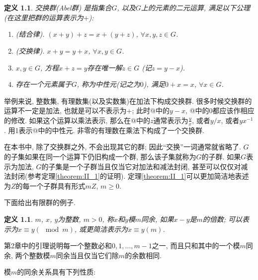 \documentclass[12pt,a4paper]{book} %
\makeatletter
\newcommand{\Rmnum}[1]{\expandafter\@slowromancap\romannumeral #1@}
\newtheorem{definition}[theorem]{定义}
\theoremstyle{remark}
\theoremstyle{example}
\theoremstyle{lemma}
\theoremstyle{corollary}
\numberwithin{theorem}{chapter}
\makeatother
\begin{document}
\chapter{} \label{chapter:5}
\begin{definition}
交换群(Abel群)  是指集合$G$, 以及$G$上的元素的二元运算, 满足以下公理(在这里把群的运算表示为$+$):
\begin{enumerate}
\item[\Rmnum{1}] (结合律). $(x + y) + z = x + (y + z)$, $\forall x, y, z \in G$.

\item[\Rmnum{2}] (交换律). $x + y = y + x$, $\forall x, y \in G$.

\item[\Rmnum{3}] $x, y \in G$, 方程$x + z = y$存在唯一解$z \in G$ (记$z = y - x$).

\item[\Rmnum{4}] 存在一个元素属于$G$, 称为中性元(记之为$0$), 满足$0 + x = x$, $\forall x \in G$.

\end{enumerate}
\end{definition}

举例来说, 整数集, 有理数集(以及实数集)在加法下构成交换群. 很多时候交换群的运算不一定是加法, 也就是可以不表示为$+$; 此时\Rmnum{3}中的$y - x$, \Rmnum{4}中的$0$都应该作相应的修改. 如果这个运算以乘法表示, 那么在\Rmnum{3}中的$z$通常表示为$\frac{y}{x}$, 或者$y / x$, 或者$yx^{-1}$. 用1表示\Rmnum{4}中的中性元. 非零的有理数在乘法下构成了一个交换群.

在本书中, 除了交换群之外, 不会出现其它的群; 因此``交换''一词通常就省略了. $G$的子集如果在同一个运算下仍旧构成一个群, 那么该子集就称为$G$的子群. 如果$G$表示为加法, $G$的子集是一个子群当且仅当它对加法和减法封闭, 甚至可以仅仅对减法封闭(参考定理\ref{theorem:II_1}的证明). 定理\ref{theorem:II_1}可以更加简洁地表述为$Z$的每一个子群具有形式$mZ$, $m \ge 0$.

下面给出有限群的例子.

\begin{definition}
$m$, $x$, $y$为整数, $m > 0$, 称$x$和$y$模$m$同余, 如果$x - y$是$m$的倍数; 可以表示为$x \equiv y (\mod m)$, 或更简洁表示为$x \equiv y(m)$.
\end{definition}

第2章中的引理说明每一个整数必和$0, 1, \ldots, m - 1$之一, 而且只和其中的一个模$m$同余, 两个整数模$m$同余当且仅当它们除$m$的余数相同.

模$m$的同余关系具有下列性质:
\end{document}
